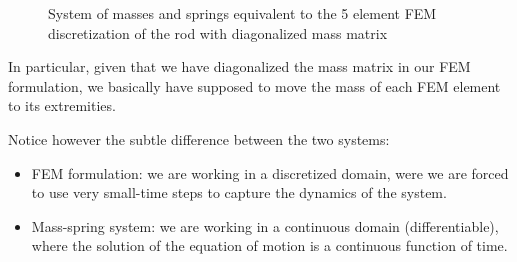 \begin{figure}[H]
    \centering


    \caption{System of masses and springs equivalent to the 5 element FEM discretization of the rod with diagonalized mass matrix}
    \label{fig:masses_and_springs}

\end{figure}

In particular, given that we have diagonalized the mass matrix in our FEM formulation, we basically have supposed to move the mass of each FEM element to its extremities.

Notice however the subtle difference between the two systems:

\begin{itemize}
    \item FEM formulation: we are working in a discretized domain, were we are forced to use very small-time steps to capture the dynamics of the system.
    \item Mass-spring system: we are working in a continuous domain (differentiable), where the solution of the equation of motion is a continuous function of time.
\end{itemize}

